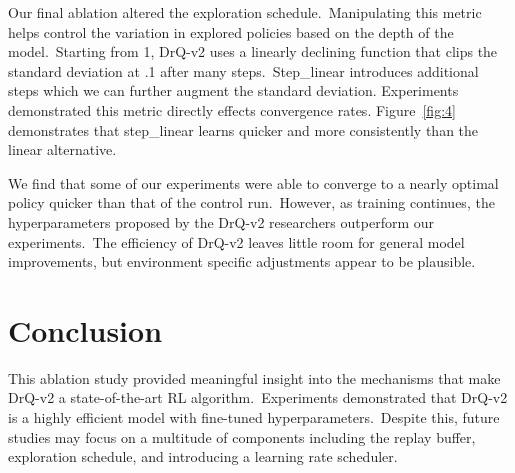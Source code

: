 \documentclass[conference]{./IEEEtran/IEEEtran} %
\begin{document}
    Our final ablation altered the exploration schedule.\ Manipulating this metric helps control the variation in explored policies
    based on the depth of the model.\ Starting from 1, DrQ-v2 uses a linearly declining function that clips the standard deviation
    at .1 after many steps.\ Step\_linear introduces additional steps which we can further augment the standard deviation. Experiments
    demonstrated this metric directly effects convergence rates. Figure~\ref{fig:4} demonstrates that step\_linear learns quicker
    and more consistently than the linear alternative.\

    We find that some of our experiments were able to converge to a nearly optimal policy quicker than that of the control run.\
    However, as training continues, the hyperparameters proposed by the DrQ-v2 researchers outperform our experiments.\ The efficiency
    of DrQ-v2 leaves little room for general model improvements, but environment specific adjustments appear to be plausible.\



    \section{Conclusion}\label{sec:conclusion}

    This ablation study provided meaningful insight into the mechanisms that make DrQ-v2 a state-of-the-art RL algorithm.\ Experiments
    demonstrated that DrQ-v2 is a highly efficient model with fine-tuned hyperparameters.\ Despite this, future studies may
    focus on a multitude of components including the replay buffer, exploration schedule, and introducing a learning rate scheduler.\


    
    
\end{document}
